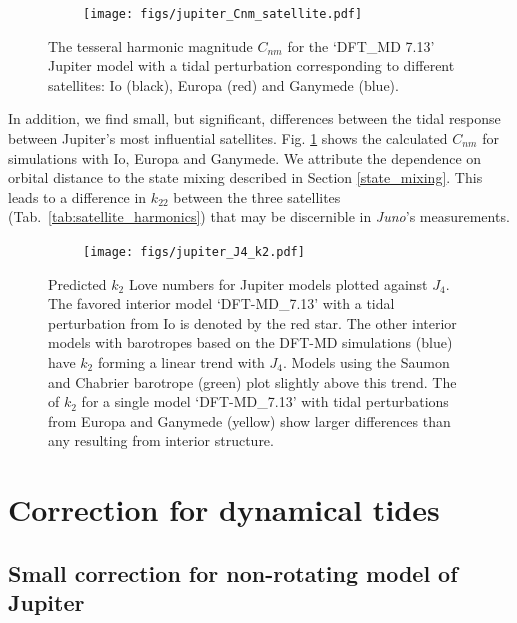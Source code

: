 \begin{figure}[h!]  
  \centering
    \texttt{[image: figs/jupiter\_Cnm\_satellite.pdf]}
\caption{ The tesseral harmonic magnitude $C_{nm}$ for the `DFT\_MD 7.13' Jupiter
model with a tidal perturbation corresponding to different satellites: Io (black),
Europa (red) and Ganymede (blue).}
\label{fig:tesseral_satellites}
\end{figure}

In addition, we find small, but significant, differences between the tidal response
between Jupiter's most influential satellites. Fig. \ref{fig:tesseral_satellites}
shows the calculated $C_{nm}$ for simulations with Io, Europa and Ganymede. We
attribute the dependence on orbital distance to the state mixing described in Section
\ref{state_mixing}. This leads to a difference in $k_{22}$ between the three
satellites (Tab.~\ref{tab:satellite_harmonics}) that may be discernible in
\textit{Juno}'s measurements.


\begin{figure}[h!]  
  \centering
    \texttt{[image: figs/jupiter\_J4\_k2.pdf]}
\caption{ Predicted $k_2$ Love numbers for Jupiter models plotted against $J_4$. The
    favored interior model `DFT-MD\_7.13' with a tidal perturbation from Io is
    denoted by the red star. The other interior models with barotropes based on the
    DFT-MD simulations (blue) have $k_2$ forming a linear trend with $J_4$.  Models
    using the Saumon and Chabrier barotrope (green) plot slightly above this trend.
    The of $k_2$ for a single model `DFT-MD\_7.13' with tidal perturbations from
    Europa and Ganymede (yellow) show larger differences than any resulting from
    interior structure.
    \label{fig:J4_k2}}
\end{figure}

\section{Correction for dynamical tides}

\subsection{Small correction for non-rotating model of Jupiter}

